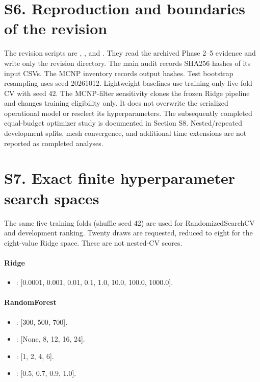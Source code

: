 \section*{S6. Reproduction and boundaries of the revision}

The revision scripts are , , and . They read the archived Phase 2--5 evidence and write only the revision directory. The main audit records SHA256 hashes of its input CSVs. The MCNP inventory records output hashes. Test bootstrap resampling uses seed 20261012. Lightweight baselines use training-only five-fold CV with seed 42. The MCNP-filter sensitivity clones the frozen Ridge pipeline and changes training eligibility only. It does not overwrite the serialized operational model or reselect its hyperparameters. The subsequently completed equal-budget optimizer study is documented in Section S8. Nested/repeated development splits, mesh convergence, and additional time extensions are not reported as completed analyses.

\section*{S7. Exact finite hyperparameter search spaces}

The same five training folds (shuffle seed 42) are used for RandomizedSearchCV and development ranking. Twenty draws are requested, reduced to eight for the eight-value Ridge space. These are not nested-CV scores.

\paragraph{Ridge}

\begin{itemize}

\item {}: [0.0001, 0.001, 0.01, 0.1, 1.0, 10.0, 100.0, 1000.0].

\end{itemize}

\paragraph{RandomForest}

\begin{itemize}

\item {}: [300, 500, 700].

\item {}: [None, 8, 12, 16, 24].

\item {}: [1, 2, 4, 6].

\item {}: [0.5, 0.7, 0.9, 1.0].

\end{itemize}

